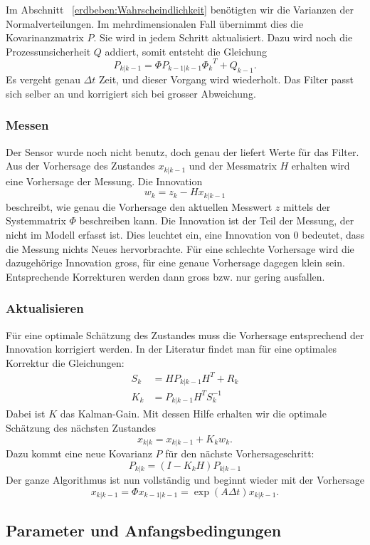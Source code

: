 Im Abschnitt ~\ref{erdbeben:Wahrscheindlichkeit} benötigten wir die Varianzen der Normalverteilungen. 
Im mehrdimensionalen Fall übernimmt dies die Kovarinanzmatrix $P$.
Sie wird in jedem Schritt aktualisiert. 
Dazu wird noch die Prozessunsicherheit $Q$ addiert, somit entsteht die Gleichung
\[
{P_{k|k-1}}=\Phi {P_{k-1|k-1}} {\Phi _{k}}^T + {Q_{k-1}}.
\] 
Es vergeht genau $\Delta t$ Zeit, und dieser Vorgang wird wiederholt.  
Das Filter passt sich selber an und korrigiert sich bei grosser Abweichung.

\subsubsection*{Messen}
Der Sensor wurde noch nicht benutz, doch genau der liefert Werte für das Filter. 
Aus der Vorhersage des Zustandes $x_{k|k-1}$ und der Messmatrix $H$ erhalten wird eine Vorhersage der Messung. 
Die Innovation
\[
{w_{k}}={z_{k}}-{H}{x_{k|k-1}}
\] 
beschreibt, wie genau die Vorhersage den aktuellen Messwert $z$ mittels der Systemmatrix $\Phi$ beschreiben kann. 
Die Innovation ist der Teil der Messung, der nicht im Modell erfasst ist.
Dies leuchtet ein, eine Innovation von $0$ bedeutet, dass die Messung nichts Neues hervorbrachte.
Für eine schlechte Vorhersage wird die dazugehörige Innovation gross, für eine genaue Vorhersage dagegen klein sein. 
Entsprechende Korrekturen werden dann gross bzw. nur gering ausfallen. 

\subsubsection*{Aktualisieren}

Für eine optimale Schätzung des Zustandes muss die Vorhersage entsprechend der Innovation korrigiert werden.
In der Literatur findet man für eine optimales Korrektur die Gleichungen:
\begin{align*}
{S_{k}} &={H}{P_{k|k-1}}{H}^T+{R_{k}}
\\
{K_{k}} &= {P_{k|k-1}} {H^T}{S_{k}^{-1}}
\end{align*}
Dabei ist $K$ das Kalman-Gain. 
Mit dessen Hilfe erhalten wir die optimale Schätzung des nächsten Zustandes
\[
{x_{k|k}}={x_{k|k-1}}+{K_{k}}{w_{k}}.
\] 
Dazu kommt eine neue Kovarianz $P$ für den nächste Vorhersageschritt:
\[
{P_{k|k}}=(I-{K_{k}}{H}){P_{k|k-1}} 
\] 
Der ganze Algorithmus ist nun vollständig und beginnt wieder mit der Vorhersage 
\[
{x_{k|k-1}}=\Phi{x_{k-1|k-1}}= \exp(A\Delta t){x_{k|k-1}}.
\] 


\subsection{Parameter und Anfangsbedingungen}
